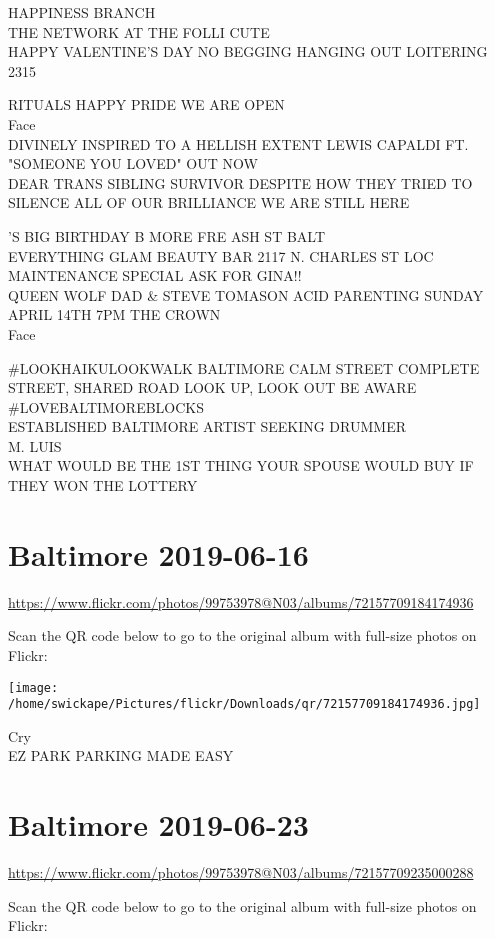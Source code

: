 \documentclass[10pt,letterpaper]{article}
\begin{document}
HAPPINESS BRANCH\\
THE NETWORK AT THE FOLLI CUTE\\
HAPPY VALENTINE'S DAY NO BEGGING HANGING OUT LOITERING\\
2315

RITUALS HAPPY PRIDE WE ARE OPEN\\
Face\\
DIVINELY INSPIRED TO A HELLISH EXTENT LEWIS CAPALDI FT. "SOMEONE YOU LOVED" OUT NOW\\
DEAR TRANS SIBLING SURVIVOR DESPITE HOW THEY TRIED TO SILENCE ALL OF OUR BRILLIANCE WE ARE STILL HERE

'S BIG BIRTHDAY B MORE FRE ASH ST BALT\\
EVERYTHING GLAM BEAUTY BAR 2117 N. CHARLES ST LOC MAINTENANCE SPECIAL ASK FOR GINA!!\\
QUEEN WOLF DAD \& STEVE TOMASON ACID PARENTING SUNDAY APRIL 14TH 7PM THE CROWN\\
Face

\#LOOKHAIKULOOKWALK BALTIMORE CALM STREET COMPLETE STREET, SHARED ROAD LOOK UP, LOOK OUT BE AWARE \#LOVEBALTIMOREBLOCKS\\
ESTABLISHED BALTIMORE ARTIST SEEKING DRUMMER\\
M. LUIS\\
WHAT WOULD BE THE 1ST THING YOUR SPOUSE WOULD BUY IF THEY WON THE LOTTERY


\section*{Baltimore 2019-06-16}

\url{https://www.flickr.com/photos/99753978@N03/albums/72157709184174936}

Scan the QR code below to go to the original album with full-size photos on Flickr:

\texttt{[image: /home/swickape/Pictures/flickr/Downloads/qr/72157709184174936.jpg]}


Cry\\
EZ PARK PARKING MADE EASY


\section*{Baltimore 2019-06-23}

\url{https://www.flickr.com/photos/99753978@N03/albums/72157709235000288}

Scan the QR code below to go to the original album with full-size photos on Flickr:
\end{document}
